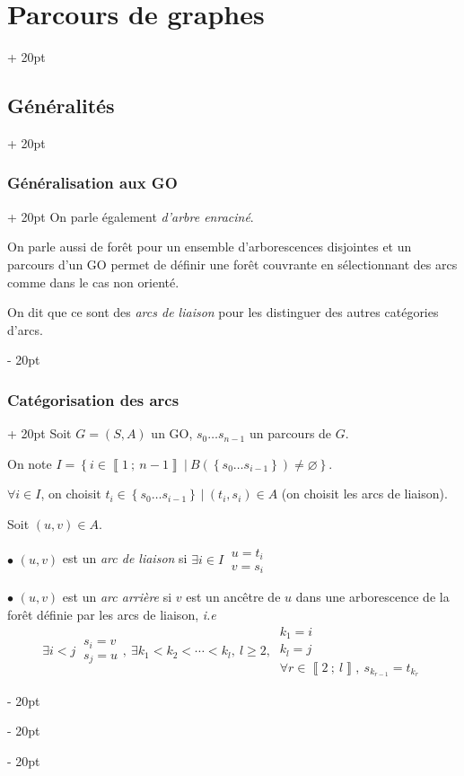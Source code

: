 \documentclass[a4paper, 12pt, twoside]{article}
\newcommand{\nset}[2]{\left\llbracket #1\ ;\ #2 \right\rrbracket}
\newcommand{\set}[1]{\left\{ #1 \right\}}
\renewcommand{\ge}{\geqslant}
\newcommand{\ind}[1][20pt]{\advance\leftskip + #1}
\newcommand{\deind}[1][20pt]{\advance\leftskip - #1}
\newenvironment{indt}[2][20pt]{#2 \par \ind[#1]}{\par \deind} %
\begin{document}
\begin{indt}{\section{Parcours de graphes}}
\begin{indt}{\subsection{Généralités}}
\begin{indt}{\subsubsection{Généralisation aux GO}}
                On parle également \textit{d'arbre enraciné}.

                On parle aussi de forêt pour un ensemble d'arborescences disjointes et un parcours d'un GO permet de définir une forêt couvrante en sélectionnant des arcs comme dans le cas non orienté.

                On dit que ce sont des \textit{arcs de liaison} pour les distinguer des autres catégories d'arcs.
            \end{indt}

            \vspace{12pt}
            
            \begin{indt}{\subsubsection{Catégorisation des arcs}}
                Soit $G = (S, A)$ un GO, $s_0 \ldots s_{n - 1}$ un parcours de $G$.

                On note $I = \set{i \in \nset{1}{n - 1}\ |\ B(\set{s_0 \ldots s_{i - 1}}) \neq \varnothing}$.

                $\forall i \in I$, on choisit $t_i \in \set{s_0 \ldots s_{i - 1}}\ |\ (t_i, s_i) \in A$ (on choisit les arcs de liaison).

                Soit $(u, v) \in A$.

                \vspace{6pt}
                
                $\bullet$ $(u, v)$ est un \textit{arc de liaison} si
                $
                    \exists i \in I\
                    \begin{array}{|l}
                        u = t_i
                        \\
                        v = s_i
                    \end{array}
                $

                $\bullet$ $(u, v)$ est un \textit{arc arrière} si $v$ est un ancêtre de $u$ dans une arborescence de la forêt définie par les arcs de liaison, \textit{i.e}
                \[
                    \exists i < j\
                    \begin{array}{|l}
                        s_i = v
                        \\
                        s_j = u
                    \end{array}
                    ,\
                    \exists k_1 < k_2 < \cdots < k_l,\ l \ge 2,\
                    \begin{array}{|l}
                        k_1 = i
                        \\
                        k_l = j
                        \\
                        \forall r \in \nset 2 l,\ s_{k_{r - 1}} = t_{k_r}
                    \end{array}
                \]


\end{indt}
\end{indt}
\end{indt}
\end{document}
